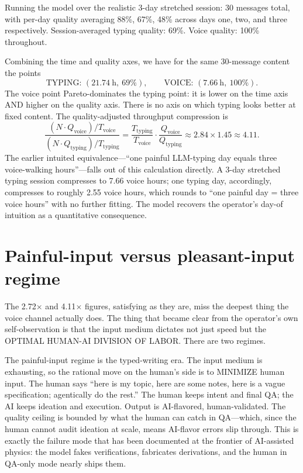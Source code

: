 \documentclass[11pt]{article}
\begin{document}
Running the model over the realistic 3-day stretched session: 30 messages total, with per-day quality averaging 88\%, 67\%, 48\% across days one, two, and three respectively. Session-averaged typing quality: 69\%. Voice quality: 100\% throughout.

Combining the time and quality axes, we have for the same 30-message content the points
\[
\text{TYPING: } (21.74~\text{h},~69\%), \qquad \text{VOICE: } (7.66~\text{h},~100\%).
\]
The voice point Pareto-dominates the typing point: it is lower on the time axis AND higher on the quality axis. There is no axis on which typing looks better at fixed content. The quality-adjusted throughput compression is
\[
\frac{(N \cdot Q_{\text{voice}}) / T_{\text{voice}}}{(N \cdot Q_{\text{typing}}) / T_{\text{typing}}} = \frac{T_{\text{typing}}}{T_{\text{voice}}} \cdot \frac{Q_{\text{voice}}}{Q_{\text{typing}}} \approx 2.84 \times 1.45 \approx 4.11.
\]
The earlier intuited equivalence---``one painful LLM-typing day equals three voice-walking hours''---falls out of this calculation directly. A 3-day stretched typing session compresses to 7.66 voice hours; one typing day, accordingly, compresses to roughly 2.55 voice hours, which rounds to ``one painful day = three voice hours'' with no further fitting. The model recovers the operator's day-of intuition as a quantitative consequence.

\section{Painful-input versus pleasant-input regime}

The 2.72$\times$ and 4.11$\times$ figures, satisfying as they are, miss the deepest thing the voice channel actually does. The thing that became clear from the operator's own self-observation is that the input medium dictates not just speed but the OPTIMAL HUMAN-AI DIVISION OF LABOR. There are two regimes.

The painful-input regime is the typed-writing era. The input medium is exhausting, so the rational move on the human's side is to MINIMIZE human input. The human says ``here is my topic, here are some notes, here is a vague specification; agentically do the rest.'' The human keeps intent and final QA; the AI keeps ideation and execution. Output is AI-flavored, human-validated. The quality ceiling is bounded by what the human can catch in QA---which, since the human cannot audit ideation at scale, means AI-flavor errors slip through. This is exactly the failure mode that has been documented at the frontier of AI-assisted physics: the model fakes verifications, fabricates derivations, and the human in QA-only mode nearly ships them.
\end{document}
